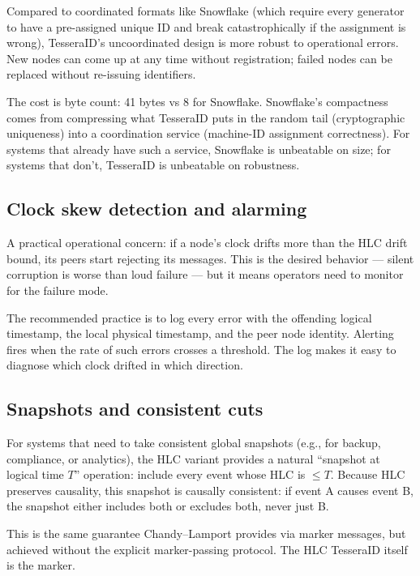 Compared to coordinated formats like Snowflake \citep{snowflake} (which require every generator to have a pre-assigned unique ID and break catastrophically if the assignment is wrong), TesseraID's uncoordinated design is more robust to operational errors. New nodes can come up at any time without registration; failed nodes can be replaced without re-issuing identifiers.

The cost is byte count: 41 bytes vs 8 for Snowflake. Snowflake's compactness comes from compressing what TesseraID puts in the random tail (cryptographic uniqueness) into a coordination service (machine-ID assignment correctness). For systems that already have such a service, Snowflake is unbeatable on size; for systems that don't, TesseraID is unbeatable on robustness.

\subsection{Clock skew detection and alarming}

A practical operational concern: if a node's clock drifts more than the HLC drift bound, its peers start rejecting its messages. This is the desired behavior --- silent corruption is worse than loud failure --- but it means operators need to monitor for the failure mode.

The recommended practice is to log every  error with the offending logical timestamp, the local physical timestamp, and the peer node identity. Alerting fires when the rate of such errors crosses a threshold. The log makes it easy to diagnose which clock drifted in which direction.

\subsection{Snapshots and consistent cuts}

For systems that need to take consistent global snapshots (e.g., for backup, compliance, or analytics), the HLC variant provides a natural ``snapshot at logical time $T$'' operation: include every event whose HLC is $\leq T$. Because HLC preserves causality, this snapshot is causally consistent: if event A causes event B, the snapshot either includes both or excludes both, never just B.

This is the same guarantee Chandy--Lamport \citep{chandylamport1985} provides via marker messages, but achieved without the explicit marker-passing protocol. The HLC TesseraID itself is the marker.

